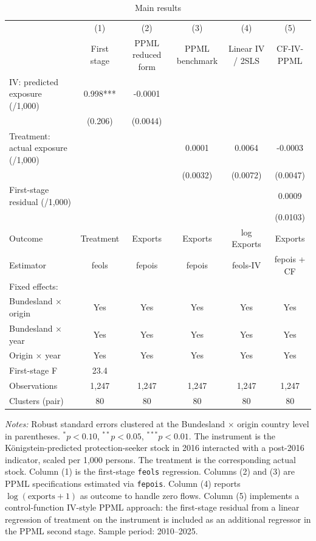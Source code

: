\begin{table}[!htbp]
\centering
\caption{Main results}
\label{tab:main_results}
\small
\begin{tabular}{lccccc}
\toprule
 & (1) & (2) & (3) & (4) & (5) \\
 & First stage & PPML reduced form & PPML benchmark & Linear IV / 2SLS & CF-IV-PPML \\
\midrule
IV: predicted exposure (/1,000) & 0.998*** & -0.0001 &  &  &  \\
 & (0.206) & (0.0044) &  &  &  \\
Treatment: actual exposure (/1,000) &  &  & 0.0001 & 0.0064 & -0.0003 \\
 &  &  & (0.0032) & (0.0072) & (0.0047) \\
First-stage residual (/1,000) &  &  &  &  & 0.0009 \\
 &  &  &  &  & (0.0103) \\
\midrule
Outcome & Treatment & Exports & Exports & log Exports & Exports \\
Estimator & feols & fepois & fepois & feols-IV & fepois + CF \\
\midrule
Fixed effects: &  &  &  &  &  \\
  Bundesland × origin & Yes & Yes & Yes & Yes & Yes \\
  Bundesland × year & Yes & Yes & Yes & Yes & Yes \\
  Origin × year & Yes & Yes & Yes & Yes & Yes \\
\midrule
First-stage F & 23.4 &  &  &  &  \\
Observations & 1,247 & 1,247 & 1,247 & 1,247 & 1,247 \\
Clusters (pair) & 80 & 80 & 80 & 80 & 80 \\
\bottomrule
\end{tabular}
\begin{minipage}{0.95\textwidth}
\vspace{0.2cm}
\footnotesize
\textit{Notes:} Robust standard errors clustered at the Bundesland $\times$ origin country level in parentheses. $^{*}p<0.10$, $^{**}p<0.05$, $^{***}p<0.01$. The instrument is the Königstein-predicted protection-seeker stock in 2016 interacted with a post-2016 indicator, scaled per 1,000 persons. The treatment is the corresponding actual stock. Column (1) is the first-stage \texttt{feols} regression. Columns (2) and (3) are PPML specifications estimated via \texttt{fepois}. Column (4) reports $\log(\mathrm{exports}+1)$ as outcome to handle zero flows. Column (5) implements a control-function IV-style PPML approach: the first-stage residual from a linear regression of treatment on the instrument is included as an additional regressor in the PPML second stage. Sample period: 2010--2025.
\end{minipage}
\end{table}
